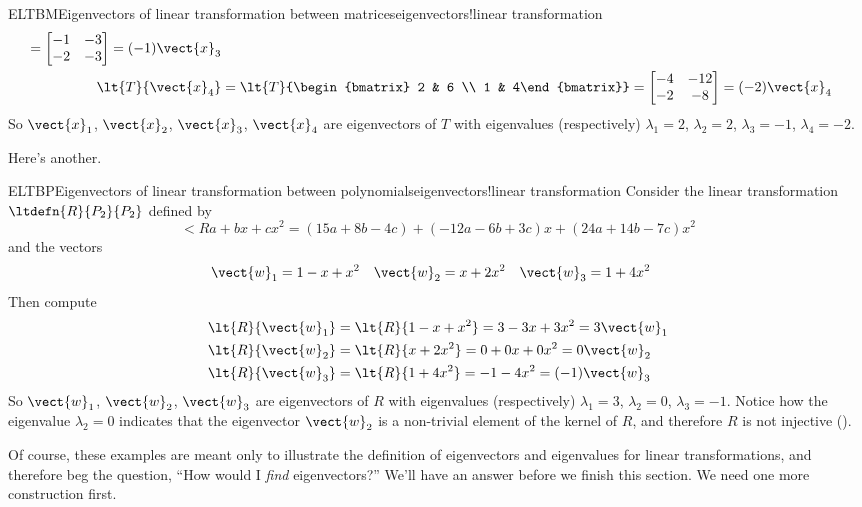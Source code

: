 \begin{example}{ELTBM}{Eigenvectors of linear transformation between matrices}{eigenvectors!linear transformation}
\begin{align*}
=
\begin{bmatrix}
 -1 & -3 \\ -2 & -3
\end{bmatrix}
=
(-1)\vect{x}_3\\
%
\lt{T}{\vect{x}_4}
&=
\lt{T}{\begin{bmatrix} 2 & 6 \\ 1 & 4\end{bmatrix}}
=
\begin{bmatrix}
 -4 & -12 \\ -2 & -8
\end{bmatrix}
=
(-2)\vect{x}_4\\
%
\end{align*}
%
So $\vect{x}_1$, $\vect{x}_2$, $\vect{x}_3$, $\vect{x}_4$ are eigenvectors of $T$ with eigenvalues (respectively) $\lambda_1=2$, $\lambda_2=2$, $\lambda_3=-1$, $\lambda_4=-2$.
%
\end{example}
%
Here's another.
%
\begin{example}{ELTBP}{Eigenvectors of linear transformation between polynomials}{eigenvectors!linear transformation}
%
Consider the linear transformation $\ltdefn{R}{P_2}{P_2}$ defined by
%
\begin{equation*}
\lt{R}{a+bx+cx^2}=
(15a+8b-4c)+(-12a-6b+3c)x+(24a+14b-7c)x^2
\end{equation*}
%
and the vectors
%
%
\begin{align*}
\vect{w}_1
&=1-x+x^2
&
%
\vect{w}_2
&=x+2x^2
&
%
\vect{w}_3
&=1+4x^2
&
%
\end{align*}
%
Then compute
%
\begin{align*}
\lt{R}{\vect{w}_1}
&=
\lt{R}{1-x+x^2}
=
3-3x+3x^2
=3\vect{w}_1\\
%
\lt{R}{\vect{w}_2}
&=
\lt{R}{x+2x^2}
=
0+0x+0x^2
=0\vect{w}_2\\
%
\lt{R}{\vect{w}_3}
&=
\lt{R}{1+4x^2}
=
-1-4x^2
=(-1)\vect{w}_3\\
%
\end{align*}
%
So $\vect{w}_1$, $\vect{w}_2$, $\vect{w}_3$ are eigenvectors of $R$ with eigenvalues (respectively) $\lambda_1=3$, $\lambda_2=0$, $\lambda_3=-1$.  Notice how the eigenvalue $\lambda_2=0$ indicates that the eigenvector $\vect{w}_2$ is a non-trivial element of the kernel of $R$, and therefore $R$ is not injective ().
%
\end{example}
%
Of course, these examples are meant only to illustrate the definition of eigenvectors and eigenvalues for linear transformations, and therefore beg the question, ``How would I {\em find} eigenvectors?''  We'll have an answer before we finish this section.  We need one more construction first.\par
